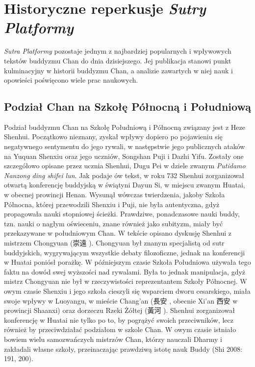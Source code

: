 \chapter{Historyczne reperkusje \textit{Sutry Platformy}}
\label{ch:chapter_four}
\textit{Sutra Platformy} pozostaje jednym z najbardziej popularnych i wpływowych tekstów buddyzmu Chan do dnia dzisiejszego. Jej publikacja stanowi punkt kulminacyjny w historii buddyzmu Chan, a analizie zawartych w niej nauk i opowieści poświęcono wiele prac naukowych.

\section{Podział Chan na Szkołę Północną i Południową}
Podział buddyzmu Chan na Szkołę Południową i Północną związany jest z Heze Shenhui.
Początkowo nieznany, zyskał wpływy dopiero po pojawieniu się negatywnego sentymentu do jego rywali, w następstwie jego publicznych ataków na Yuquan Shenxiu oraz jego uczniów, Songshan Puji i Dazhi Yifu.
Zostały one szczegółowo opisane przez ucznia Shenhui, Dugu Pei w dziele zwanym \textit{Putidamo Nanzong ding shifei lun}. %
Jak podaje ów tekst, w roku 732 Shenhui zorganizował otwartą konferencję buddyjską w świątyni Dayun Si, w miejscu zwanym Huatai, w obecnej prowincji Henan.\label{Huatai}
Wysunął wówczas twierdzenia, jakoby Szkoła Północna, której przewodzili Shenxiu i Puji, nie była autentyczna, gdyż propagowała nauki stopniowej ścieżki.
Prawdziwe, ponadczasowe nauki buddy, tzn. nauki o nagłym oświeceniu, znane również jako subityzm, miały być przekazywane w południowym Chan.
W tekście opisano dyskusję Shenhui z mistrzem Chongyuan (崇遠 ).
Chongyuan był znanym specjalistą od sutr buddyjskich, wygrywającym wszystkie debaty filozoficzne, jednak na konferencji w Huatai poniósł porażkę.
W późniejszym czasie Szkoła Południowa używała tego faktu na dowód swej wyższości nad rywalami.
Była to jednak manipulacja, gdyż mistrz Chongyuan nie był w rzeczywistości reprezentantem Szkoły Północnej.
W owym czasie Shenxiu i jego szkoła cieszyli się wsparciem dworu cesarskiego, miała swoje wpływy w Luoyangu, w mieście Chang'an (長安 , obecnie Xi'an 西安  w prowincji Shaanxi) oraz dorzeczu Rzeki Żółtej (黃河 ).
Shenhui zorganizował konferencję w Huatai nie tylko po to, by pogrążyć swoich przeciwników, lecz również by przeciwdziałać podziałom w szkole Chan.
W owym czasie istniało bowiem wielu samozwańczych mistrzów Chan, którzy nauczali Dharmy i zakładali własne szkoły, przeinaczając prawdziwą istotę nauk Buddy
(Shi 2008: 191, 200).

